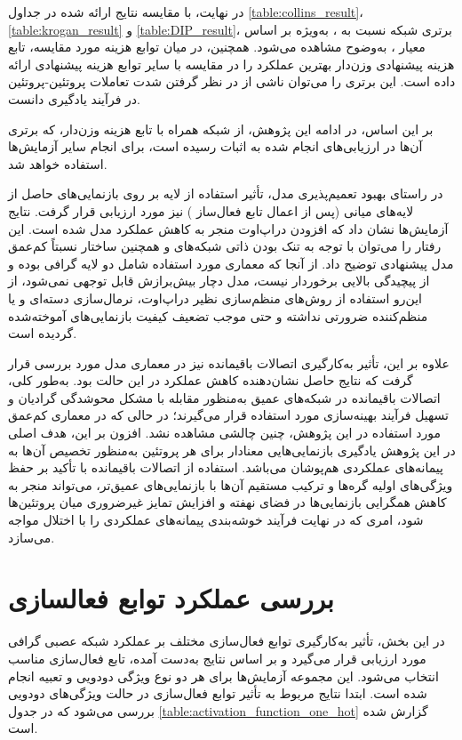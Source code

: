 در نهایت، با مقایسه نتایج ارائه‌ شده در جداول \ref{table:collins_result}، \ref{table:krogan_result} و \ref{table:DIP_result}، برتری شبکه  نسبت به ، به‌ویژه بر اساس معیار ، به‌وضوح مشاهده می‌شود. همچنین، در میان توابع هزینه مورد مقایسه، تابع هزینه پیشنهادی  وزن‌دار بهترین عملکرد را در مقایسه با سایر توابع هزینه پیشنهادی ارائه داده است. این برتری را می‌توان ناشی از در نظر گرفتن شدت تعاملات پروتئین-پروتئین در فرآیند یادگیری دانست. 

بر این اساس، در ادامه این پژوهش، از شبکه  همراه با تابع هزینه  وزن‌دار، که برتری آن‌ها در ارزیابی‌های انجام ‌شده به اثبات رسیده است، برای انجام سایر آزمایش‌ها استفاده خواهد شد.

در راستای بهبود تعمیم‌پذیری مدل، تأثیر استفاده از لایه  بر روی بازنمایی‌های حاصل از لایه‌های میانی (پس از اعمال تابع فعال‌ساز ) نیز مورد ارزیابی قرار گرفت. نتایج آزمایش‌ها نشان داد که افزودن دراپ‌اوت منجر به کاهش عملکرد مدل شده است. این رفتار را می‌توان با توجه به تنک بودن ذاتی شبکه‌های  و همچنین ساختار نسبتاً کم‌عمق مدل پیشنهادی توضیح داد. از آنجا که معماری مورد استفاده شامل دو لایه گرافی بوده و از پیچیدگی بالایی برخوردار نیست، مدل دچار بیش‌برازش قابل توجهی نمی‌شود، از این‌رو استفاده از روش‌های منظم‌سازی نظیر دراپ‌اوت، نرمال‌سازی دسته‌ای و یا منظم‌کننده  ضرورتی نداشته و حتی موجب تضعیف کیفیت بازنمایی‌های آموخته‌شده گردیده است.

علاوه بر این، تأثیر به‌کارگیری اتصالات باقیمانده نیز در معماری مدل مورد بررسی قرار گرفت که نتایج حاصل نشان‌دهنده کاهش عملکرد در این حالت بود. به‌طور کلی، اتصالات باقیمانده در شبکه‌های عمیق به‌منظور مقابله با مشکل محوشدگی گرادیان و تسهیل فرآیند بهینه‌سازی مورد استفاده قرار می‌گیرند؛ در حالی که در معماری کم‌عمق مورد استفاده در این پژوهش، چنین چالشی مشاهده نشد. افزون بر این، هدف اصلی در این پژوهش یادگیری بازنمایی‌هایی معنادار برای هر پروتئین به‌منظور تخصیص آن‌ها به پیمانه‌های عملکردی هم‌پوشان می‌باشد. استفاده از اتصالات باقیمانده با تأکید بر حفظ ویژگی‌های اولیه گره‌ها و ترکیب مستقیم آن‌ها با بازنمایی‌های عمیق‌تر، می‌تواند منجر به کاهش همگرایی بازنمایی‌ها در فضای نهفته و افزایش تمایز غیرضروری میان پروتئین‌ها شود، امری که در نهایت فرآیند خوشه‌بندی پیمانه‌های عملکردی را با اختلال مواجه می‌سازد.



\section{بررسی عملکرد توابع فعالسازی}
در این بخش، تأثیر به‌کارگیری توابع فعال‌سازی مختلف بر عملکرد شبکه‌ عصبی گرافی مورد ارزیابی قرار می‌گیرد و بر اساس نتایج به‌دست‌ آمده، تابع فعال‌سازی مناسب انتخاب می‌شود. این مجموعه آزمایش‌ها برای هر دو نوع ویژگی دودویی و تعبیه انجام شده است. ابتدا نتایج مربوط به تأثیر توابع فعال‌سازی در حالت ویژگی‌های دودویی بررسی می‌شود که در جدول \ref{table:activation_function_one_hot} گزارش شده است.

